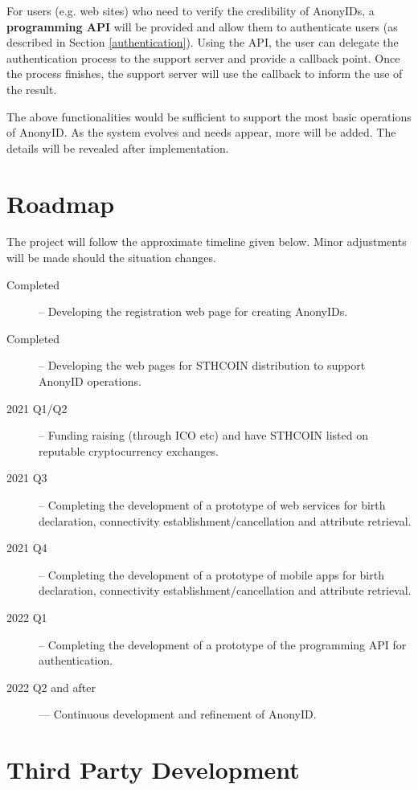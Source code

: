 \documentclass[12pt, a4paper]{article}
\begin{document}
For users (e.g. web sites) who need to verify the credibility of AnonyIDs, a \textbf{programming API} will be provided and allow them to authenticate users (as described in Section \ref{authentication}). Using the API, the user can delegate the authentication process to the support server and provide a callback point. Once the process finishes, the support server will use the callback to inform the use of the result.

The above functionalities would be sufficient to support the most basic operations of AnonyID. As the system evolves and needs appear, more will be added. The details will be revealed after implementation.

\section{Roadmap}

The project will follow the approximate timeline given below. Minor adjustments will be made should the situation changes.

\begin{description}
\item[Completed] -- Developing the registration web page for creating AnonyIDs.
\item[Completed] -- Developing the web pages for STHCOIN distribution to support AnonyID operations.
\item[2021 Q1/Q2] -- Funding raising (through ICO etc) and have STHCOIN listed on reputable cryptocurrency exchanges.
\item[2021 Q3] -- Completing the development of a prototype of web services for birth declaration, connectivity establishment/cancellation and attribute retrieval. 
\item[2021 Q4] -- Completing the development of a prototype of mobile apps for birth declaration, connectivity establishment/cancellation and attribute retrieval. 
\item[2022 Q1] -- Completing the development of a prototype of the programming API for authentication.
\item[2022 Q2 and after] --- Continuous development and refinement of AnonyID.
\end{description}

\section{Third Party Development}
\end{document}
